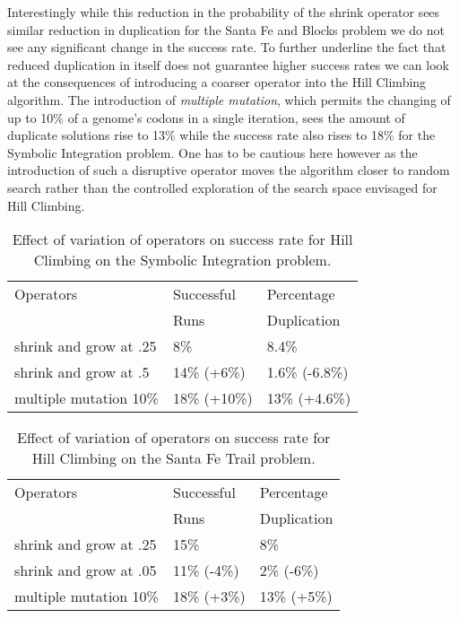 Interestingly while this reduction in the probability of the shrink operator sees similar reduction in duplication for the Santa Fe and Blocks problem we do not see any significant change in the success rate. 
To further underline the fact that reduced duplication in itself does not guarantee higher success rates we can look at the consequences of introducing a coarser operator into the Hill Climbing algorithm.
The introduction of \emph{multiple mutation}, which permits the changing of up to 10\% of a genome's codons in a single iteration, sees the amount of duplicate solutions rise to 13\% while the success rate also rises to 18\% for the Symbolic Integration problem. One has to be cautious here however as the introduction of such a disruptive operator moves the algorithm closer to random search rather than the controlled exploration of the search space envisaged for Hill Climbing. 

\begin{table}[h]
\begin{center}
\begin{tabular}{|l|l|l|}
\hline
Operators                     & Successful             & Percentage    \\
                              & Runs                   & Duplication    \\  
\hline
shrink and grow at .25       & 8\%                     &       8.4\%  \\
shrink and grow at .5        & 14\% (+6\%)             & 1.6\% (-6.8\%) \\
multiple mutation 10\%       & 18\% (+10\%)            & 13\% (+4.6\%) \\
\hline
\end{tabular}
\caption{\label{hc_symint_altmut_table} Effect of variation of operators on success rate for Hill Climbing on the Symbolic Integration problem.}
\end{center}
\end{table}


\begin{table}[h]
\begin{center}
\begin{tabular}{|l|l|l|}
\hline
Operators                     & Successful      & Percentage  \\
                              & Runs            & Duplication \\
\hline
shrink and grow at .25       & 15\%              & 8\%\\
shrink and grow at .05       & 11\% (-4\%)       & 2\% (-6\%)\\
multiple mutation 10\%       & 18\% (+3\%)       & 13\% (+5\%) \\
\hline
\end{tabular}
\caption{\label{hc_santafe_altmut_table} Effect of variation of operators on success rate for Hill Climbing on the Santa Fe Trail problem.}
\end{center}
\end{table}




